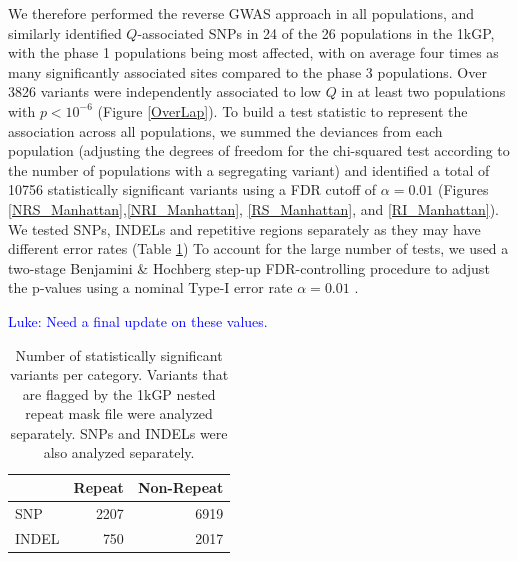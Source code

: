 \documentclass[9pt,lineno]{elife}
\newcommand{\sgcomment}[1]{\textcolor{blue}{SG: #1}}
\newcommand{\luke}[1]{\textcolor{blue}{Luke: #1}}
\begin{document}
We therefore performed the reverse GWAS approach in all populations, and similarly identified $Q$-associated SNPs in 24 of the 26 populations in the 1kGP, with the phase 1 populations being most affected, with on average four times as many significantly associated sites compared to the phase 3 populations.
Over 3826 variants were independently associated to low $Q$ in at least two populations with $ p < 10^{-6}$ (Figure \ref{OverLap}). 
To build a test statistic to represent the association across all populations, we summed the deviances from each population (adjusting the degrees of freedom for the chi-squared test according to the number of populations with a segregating variant) and identified a total of 10756 statistically significant variants using a FDR cutoff of $\alpha = 0.01$ (Figures \ref{NRS_Manhattan},\ref{NRI_Manhattan}, \ref{RS_Manhattan}, and \ref{RI_Manhattan}).
We tested SNPs, INDELs and repetitive regions separately as they may have different error rates (Table \ref{sigTable})
To account for the large number of tests, we used a two-stage Benjamini \& Hochberg step-up FDR-controlling procedure to adjust the p-values using a nominal Type-I error rate $\alpha = 0.01$ \citep{Benjamini2006}. 

\luke{Need a final update on these values.}
\begin{table}[h]
\begin{tabular}{l  r r}
                      & {Repeat}  & {Non-Repeat}       \\ \hline
{SNP}  & 2207 & 6919 \\  
{INDEL} & 750  & 2017 \\ \hline
\end{tabular}
\caption{Number of statistically significant variants per category. Variants that are flagged by the 1kGP nested repeat mask file were analyzed separately. SNPs and INDELs were also analyzed separately.}
\label{sigTable}
\end{table}
\end{document}

